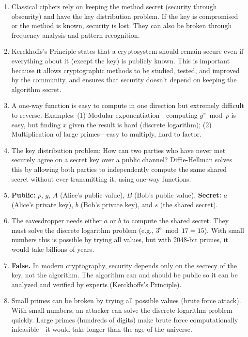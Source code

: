 \documentclass[11pt]{article}
\begin{document}
\begin{enumerate}[label=\textbf{\arabic*.}]
    \item Classical ciphers rely on keeping the method secret (security through obscurity) and have the key distribution problem. If the key is compromised or the method is known, security is lost. They can also be broken through frequency analysis and pattern recognition.
    
    \item Kerckhoffs's Principle states that a cryptosystem should remain secure even if everything about it (except the key) is publicly known. This is important because it allows cryptographic methods to be studied, tested, and improved by the community, and ensures that security doesn't depend on keeping the algorithm secret.
    
    \item A one-way function is easy to compute in one direction but extremely difficult to reverse. Examples: (1) Modular exponentiation—computing $g^x \bmod p$ is easy, but finding $x$ given the result is hard (discrete logarithm); (2) Multiplication of large primes—easy to multiply, hard to factor.
    
    \item The key distribution problem: How can two parties who have never met securely agree on a secret key over a public channel? Diffie-Hellman solves this by allowing both parties to independently compute the same shared secret without ever transmitting it, using one-way functions.
    
    \item \textbf{Public:} $p$, $g$, $A$ (Alice's public value), $B$ (Bob's public value). \textbf{Secret:} $a$ (Alice's private key), $b$ (Bob's private key), and $s$ (the shared secret).
    
    \item The eavesdropper needs either $a$ or $b$ to compute the shared secret. They must solve the discrete logarithm problem (e.g., $3^a \bmod 17 = 15$). With small numbers this is possible by trying all values, but with 2048-bit primes, it would take billions of years.
    
    \item \textbf{False.} In modern cryptography, security depends only on the secrecy of the key, not the algorithm. The algorithm can and should be public so it can be analyzed and verified by experts (Kerckhoffs's Principle).
    
    \item Small primes can be broken by trying all possible values (brute force attack). With small numbers, an attacker can solve the discrete logarithm problem quickly. Large primes (hundreds of digits) make brute force computationally infeasible—it would take longer than the age of the universe.
\end{enumerate}
\end{document}
